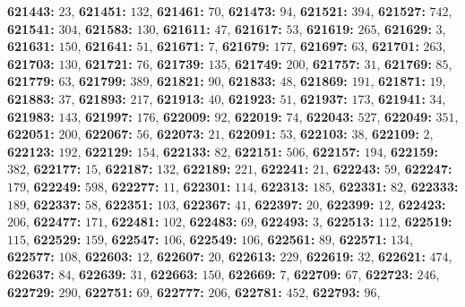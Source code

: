 \textsf{\bfseries 621443:} $23$, \textsf{\bfseries 621451:} $132$, \textsf{\bfseries 621461:} $70$, \textsf{\bfseries 621473:} $94$, \textsf{\bfseries 621521:} $394$, \textsf{\bfseries 621527:} $742$, \textsf{\bfseries 621541:} $304$, \textsf{\bfseries 621583:} $130$, \textsf{\bfseries 621611:} $47$, \textsf{\bfseries 621617:} $53$, \textsf{\bfseries 621619:} $265$, \textsf{\bfseries 621629:} $3$, \textsf{\bfseries 621631:} $150$, \textsf{\bfseries 621641:} $51$, \textsf{\bfseries 621671:} $7$, \textsf{\bfseries 621679:} $177$, \textsf{\bfseries 621697:} $63$, \textsf{\bfseries 621701:} $263$, \textsf{\bfseries 621703:} $130$, \textsf{\bfseries 621721:} $76$, \textsf{\bfseries 621739:} $135$, \textsf{\bfseries 621749:} $200$, \textsf{\bfseries 621757:} $31$, \textsf{\bfseries 621769:} $85$, \textsf{\bfseries 621779:} $63$, \textsf{\bfseries 621799:} $389$, \textsf{\bfseries 621821:} $90$, \textsf{\bfseries 621833:} $48$, \textsf{\bfseries 621869:} $191$, \textsf{\bfseries 621871:} $19$, \textsf{\bfseries 621883:} $37$, \textsf{\bfseries 621893:} $217$, \textsf{\bfseries 621913:} $40$, \textsf{\bfseries 621923:} $51$, \textsf{\bfseries 621937:} $173$, \textsf{\bfseries 621941:} $34$, \textsf{\bfseries 621983:} $143$, \textsf{\bfseries 621997:} $176$, \textsf{\bfseries 622009:} $92$, \textsf{\bfseries 622019:} $74$, \textsf{\bfseries 622043:} $527$, \textsf{\bfseries 622049:} $351$, \textsf{\bfseries 622051:} $200$, \textsf{\bfseries 622067:} $56$, \textsf{\bfseries 622073:} $21$, \textsf{\bfseries 622091:} $53$, \textsf{\bfseries 622103:} $38$, \textsf{\bfseries 622109:} $2$, \textsf{\bfseries 622123:} $192$, \textsf{\bfseries 622129:} $154$, \textsf{\bfseries 622133:} $82$, \textsf{\bfseries 622151:} $506$, \textsf{\bfseries 622157:} $194$, \textsf{\bfseries 622159:} $382$, \textsf{\bfseries 622177:} $15$, \textsf{\bfseries 622187:} $132$, \textsf{\bfseries 622189:} $221$, \textsf{\bfseries 622241:} $21$, \textsf{\bfseries 622243:} $59$, \textsf{\bfseries 622247:} $179$, \textsf{\bfseries 622249:} $598$, \textsf{\bfseries 622277:} $11$, \textsf{\bfseries 622301:} $114$, \textsf{\bfseries 622313:} $185$, \textsf{\bfseries 622331:} $82$, \textsf{\bfseries 622333:} $189$, \textsf{\bfseries 622337:} $58$, \textsf{\bfseries 622351:} $103$, \textsf{\bfseries 622367:} $41$, \textsf{\bfseries 622397:} $20$, \textsf{\bfseries 622399:} $12$, \textsf{\bfseries 622423:} $206$, \textsf{\bfseries 622477:} $171$, \textsf{\bfseries 622481:} $102$, \textsf{\bfseries 622483:} $69$, \textsf{\bfseries 622493:} $3$, \textsf{\bfseries 622513:} $112$, \textsf{\bfseries 622519:} $115$, \textsf{\bfseries 622529:} $159$, \textsf{\bfseries 622547:} $106$, \textsf{\bfseries 622549:} $106$, \textsf{\bfseries 622561:} $89$, \textsf{\bfseries 622571:} $134$, \textsf{\bfseries 622577:} $108$, \textsf{\bfseries 622603:} $12$, \textsf{\bfseries 622607:} $20$, \textsf{\bfseries 622613:} $229$, \textsf{\bfseries 622619:} $32$, \textsf{\bfseries 622621:} $474$, \textsf{\bfseries 622637:} $84$, \textsf{\bfseries 622639:} $31$, \textsf{\bfseries 622663:} $150$, \textsf{\bfseries 622669:} $7$, \textsf{\bfseries 622709:} $67$, \textsf{\bfseries 622723:} $246$, \textsf{\bfseries 622729:} $290$, \textsf{\bfseries 622751:} $69$, \textsf{\bfseries 622777:} $206$, \textsf{\bfseries 622781:} $452$, \textsf{\bfseries 622793:} $96$, 
